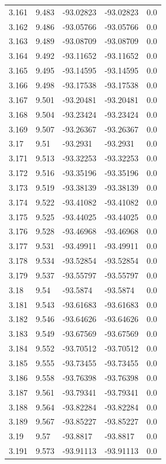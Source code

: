\begin{tabular}{lllll}
3.161 & 9.483 & -93.02823 & -93.02823 & 0.0 \\
3.162 & 9.486 & -93.05766 & -93.05766 & 0.0 \\
3.163 & 9.489 & -93.08709 & -93.08709 & 0.0 \\
3.164 & 9.492 & -93.11652 & -93.11652 & 0.0 \\
3.165 & 9.495 & -93.14595 & -93.14595 & 0.0 \\
3.166 & 9.498 & -93.17538 & -93.17538 & 0.0 \\
3.167 & 9.501 & -93.20481 & -93.20481 & 0.0 \\
3.168 & 9.504 & -93.23424 & -93.23424 & 0.0 \\
3.169 & 9.507 & -93.26367 & -93.26367 & 0.0 \\
3.17 & 9.51 & -93.2931 & -93.2931 & 0.0 \\
3.171 & 9.513 & -93.32253 & -93.32253 & 0.0 \\
3.172 & 9.516 & -93.35196 & -93.35196 & 0.0 \\
3.173 & 9.519 & -93.38139 & -93.38139 & 0.0 \\
3.174 & 9.522 & -93.41082 & -93.41082 & 0.0 \\
3.175 & 9.525 & -93.44025 & -93.44025 & 0.0 \\
3.176 & 9.528 & -93.46968 & -93.46968 & 0.0 \\
3.177 & 9.531 & -93.49911 & -93.49911 & 0.0 \\
3.178 & 9.534 & -93.52854 & -93.52854 & 0.0 \\
3.179 & 9.537 & -93.55797 & -93.55797 & 0.0 \\
3.18 & 9.54 & -93.5874 & -93.5874 & 0.0 \\
3.181 & 9.543 & -93.61683 & -93.61683 & 0.0 \\
3.182 & 9.546 & -93.64626 & -93.64626 & 0.0 \\
3.183 & 9.549 & -93.67569 & -93.67569 & 0.0 \\
3.184 & 9.552 & -93.70512 & -93.70512 & 0.0 \\
3.185 & 9.555 & -93.73455 & -93.73455 & 0.0 \\
3.186 & 9.558 & -93.76398 & -93.76398 & 0.0 \\
3.187 & 9.561 & -93.79341 & -93.79341 & 0.0 \\
3.188 & 9.564 & -93.82284 & -93.82284 & 0.0 \\
3.189 & 9.567 & -93.85227 & -93.85227 & 0.0 \\
3.19 & 9.57 & -93.8817 & -93.8817 & 0.0 \\
3.191 & 9.573 & -93.91113 & -93.91113 & 0.0 \\

\end{tabular}
